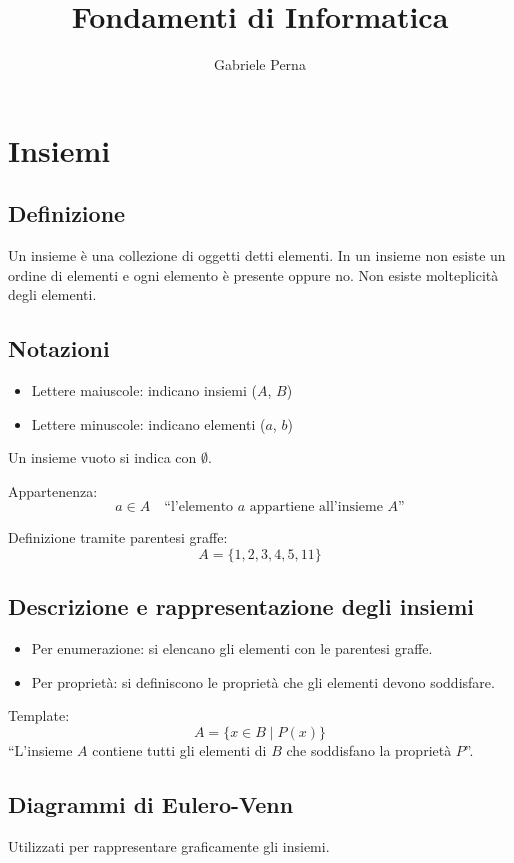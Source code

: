 \documentclass[a4paper,12pt]{article}
\title{Fondamenti di Informatica}
\author{Gabriele Perna}
\date{}
\let\oldsection\section
\renewcommand{\section}{\clearpage\oldsection}
\begin{document}
\maketitle
\tableofcontents
\section{Insiemi}

\subsection{Definizione}
Un insieme è una collezione di oggetti detti elementi.  
In un insieme non esiste un ordine di elementi e ogni elemento è presente oppure no.  
Non esiste molteplicità degli elementi.

\subsection{Notazioni}
\begin{itemize}
    \item Lettere maiuscole: indicano insiemi ($A$, $B$)
    \item Lettere minuscole: indicano elementi ($a$, $b$)
\end{itemize}

Un insieme vuoto si indica con $\emptyset$.  

Appartenenza: 
\[
a \in A \quad \text{“l'elemento $a$ appartiene all’insieme $A$”}
\]

Definizione tramite parentesi graffe:  
\[
A = \{1,2,3,4,5,11\}
\]

\subsection{Descrizione e rappresentazione degli insiemi}
\begin{itemize}
    \item Per enumerazione: si elencano gli elementi con le parentesi graffe.
    \item Per proprietà: si definiscono le proprietà che gli elementi devono soddisfare.
\end{itemize}

Template: 
\[
A = \{ x \in B \mid P(x) \}
\]
“L’insieme $A$ contiene tutti gli elementi di $B$ che soddisfano la proprietà $P$”.

\subsection{Diagrammi di Eulero-Venn}
Utilizzati per rappresentare graficamente gli insiemi.
\end{document}
